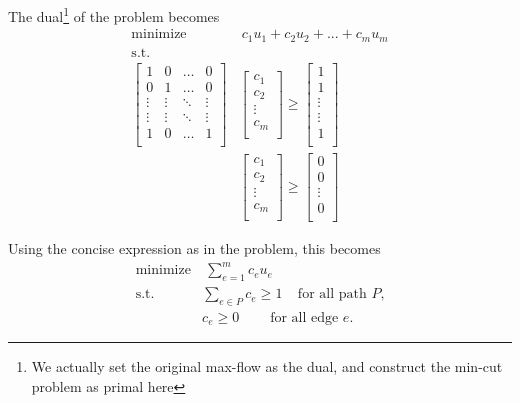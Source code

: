 \documentclass[12pt]{article}
\begin{document}
The dual\footnote{We actually set the original max-flow as the dual, and construct the min-cut problem as primal here} of the problem becomes 
\begin{align*}
\text{minimize} &~ c_1u_1 + c_2u_2 + ... + c_mu_m\\
\text{s.t.}& \\
\begin{bmatrix}
1 & 0 & \dots & 0 \\
0 & 1 & \dots & 0 \\
\vdots & \vdots & \ddots & \vdots \\
\vdots & \vdots & \ddots & \vdots \\
1 & 0 & \dots & 1 \\
\end{bmatrix} 
&\begin{bmatrix}
c_1 \\ c_2 \\ \vdots \\ c_m \\
\end{bmatrix}\geq 
\begin{bmatrix}
1 \\ 1  \\ \vdots \\ \vdots \\ 1 \\
\end{bmatrix}\\
&\begin{bmatrix}
c_1 \\ c_2 \\ \vdots \\ c_m \\
\end{bmatrix}\geq 
\begin{bmatrix}
0 \\ 0 \\ \vdots \\ 0 \\
\end{bmatrix}
\end{align*}

Using the concise expression as in the problem, this becomes 
\begin{align*}
\text{minimize} &~ \sum_{e=1}^m c_eu_e\\
\text{s.t.} & \sum_{e\in P} c_e \geq 1 ~~~~~ \text{for all path $P$,}\\
&c_e \geq 0~~~~~~~~~~ \text{for all edge $e$.}
\end{align*}
\end{document}
